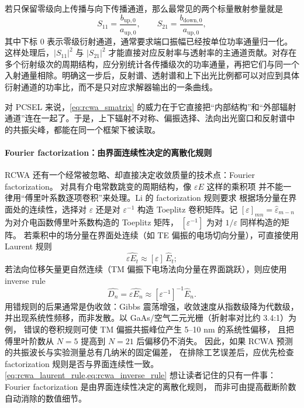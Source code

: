 若只保留零级向上传播与向下传播通道，那么最常见的两个标量散射参量就是
\begin{equation}
S_{11}=\frac{b_{\mathrm{up},0}}{a_{\mathrm{up},0}},
\qquad
S_{21}=\frac{b_{\mathrm{down},0}}{a_{\mathrm{up},0}},
\label{eq:s11_s21_def}
\end{equation}
其中下标 $0$ 表示零级衍射通道，通常要求端口振幅已经按单位功率通量归一化。这样处理后，$|S_{11}|^2$ 与 $|S_{21}|^2$ 才能直接对应反射率与透射率的主通道贡献。对存在多个衍射级次的周期结构，应分别统计各传播级次的功率通量，再把它们与同一个入射通量相除。明确这一步后，反射谱、透射谱和上下出光比例都可以对应到具体衍射通道的功率比，而不是只对应求解器输出的一条曲线。

对 PCSEL 来说，\cref{eq:rcwa_smatrix} 的威力在于它直接把“内部结构”和“外部辐射通道”连在一起了。于是，上下辐射不对称、偏振选择、法向出光窗口和反射谱中的共振尖峰，都能在同一个框架下被读取。

\paragraph{Fourier factorization：由界面连续性决定的离散化规则}
RCWA 还有一个经常被忽略、却直接决定收敛质量的技术点：Fourier factorization。
对具有介电常数跳变的周期结构，像 $\varepsilon E$ 这样的乘积项
并不能一律用“傅里叶系数逐项卷积”来处理。Li 的 factorization 规则要求
根据场分量在界面处的连续性，选择对 $\varepsilon$ 还是对 $\varepsilon^{-1}$
构造 Toeplitz 卷积矩阵\cite{li1996}。记
$[\varepsilon]_{mn}=\hat{\varepsilon}_{m-n}$ 为对介电函数傅里叶系数构造的 Toeplitz 矩阵，
$[\varepsilon^{-1}]$ 为对 $1/\varepsilon$ 同样构造的矩阵。
若乘积中的场分量在界面处连续（如 TE 偏振的电场切向分量），可直接使用 Laurent 规则
\begin{equation}
\widehat{\varepsilon E_t}
\approx
[\varepsilon]\,\hat E_t;
\label{eq:rcwa_laurent_rule}
\end{equation}
若法向位移矢量更自然连续（TM 偏振下电场法向分量在界面跳跃），则应使用 inverse rule
\begin{equation}
\widehat{D_n}
=
\widehat{\varepsilon E_n}
\approx
[\varepsilon^{-1}]^{-1}\hat E_n.
\label{eq:rcwa_inverse_rule}
\end{equation}
用错规则的后果通常是伪收敛：Gibbs 震荡增强，收敛速度从指数级降为代数级，
并出现系统性频移，而非发散。以 GaAs/空气二元光栅（折射率对比约 3.4:1）为例，
错误的卷积规则可使 TM 偏振共振峰位产生 5--10 nm 的系统性偏移，
且把傅里叶阶数从 $N=5$ 提高到 $N=21$ 后偏移仍不消失。
因此，如果 RCWA 预测的共振波长与实验测量总有几纳米的固定偏差，
在排除工艺误差后，应优先检查 factorization 规则是否与界面连续性一致。
\cref{eq:rcwa_laurent_rule,eq:rcwa_inverse_rule} 想让读者记住的只有一件事：
Fourier factorization 是由界面连续性决定的离散化规则，
而非可由提高截断阶数自动消除的数值细节。

